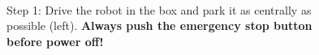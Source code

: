 \begin{figure}[!ht]
\centering
\mbox{\quad
{}}
\caption{Step 1: Drive the robot in the box and park it as centrally as possible (left). {\bf Always push the emergency stop button before power off!}} %
\end{figure}

